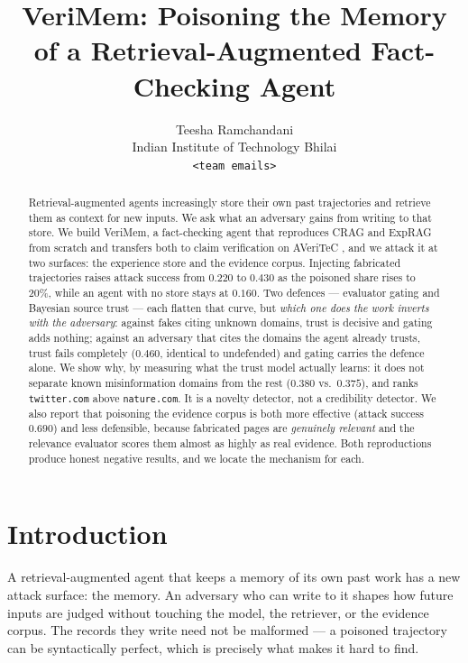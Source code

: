 \documentclass[11pt]{article}
\title{VeriMem: Poisoning the Memory of a Retrieval-Augmented Fact-Checking Agent}
\author{
  Teesha Ramchandani \\
  Indian Institute of Technology Bhilai \\
  \texttt{<team emails>}
}
\begin{document}
\maketitle

\begin{abstract}
Retrieval-augmented agents increasingly store their own past trajectories and
retrieve them as context for new inputs. We ask what an adversary gains from
writing to that store. We build VeriMem, a fact-checking agent that reproduces
CRAG \citep{yan2024crag} and ExpRAG \citep{ferraz2026exprag} from scratch and
transfers both to claim verification on AVeriTeC \citep{schlichtkrull2023averitec},
and we attack it at two surfaces: the experience store and the evidence corpus.
Injecting fabricated trajectories raises attack success from $0.220$ to $0.430$
as the poisoned share rises to 20\%, while an agent with no store stays at
$0.160$. Two defences --- evaluator gating and Bayesian source trust --- each
flatten that curve, but \emph{which one does the work inverts with the
adversary}: against fakes citing unknown domains, trust is decisive and gating
adds nothing; against an adversary that cites the domains the agent already
trusts, trust fails completely ($0.460$, identical to undefended) and gating
carries the defence alone. We show why, by measuring what the trust model
actually learns: it does not separate known misinformation domains from the rest
($0.380$ vs.\ $0.375$), and ranks \texttt{twitter.com} above \texttt{nature.com}.
It is a novelty detector, not a credibility detector. We also report that
poisoning the evidence corpus is both more effective (attack success $0.690$)
and less defensible, because fabricated pages are \emph{genuinely relevant} and
the relevance evaluator scores them almost as highly as real evidence. Both
reproductions produce honest negative results, and we locate the mechanism for
each.
\end{abstract}

\section{Introduction}

A retrieval-augmented agent that keeps a memory of its own past work has a new
attack surface: the memory. An adversary who can write to it shapes how future
inputs are judged without touching the model, the retriever, or the evidence
corpus. The records they write need not be malformed --- a poisoned trajectory
can be syntactically perfect, which is precisely what makes it hard to find.
\end{document}
